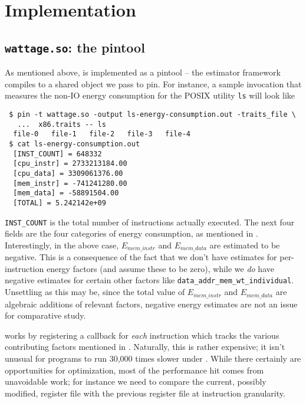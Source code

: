 \section{Implementation}

\subsection{\texttt{wattage.so}: the pintool}

As mentioned above, \wattage is implemented as a pintool -- the
estimator framework compiles to a shared object we pass to pin.  For
instance, a sample invocation that measures the non-IO energy
consumption for the POSIX utility \texttt{ls} will look like

\begin{verbatim}
 $ pin -t wattage.so -output ls-energy-consumption.out -traits_file \
   ...  x86.traits -- ls
  file-0   file-1   file-2   file-3   file-4
 $ cat ls-energy-consumption.out
  [INST_COUNT] = 648332
  [cpu_instr] = 2733213184.00
  [cpu_data] = 3309061376.00
  [mem_instr] = -741241280.00
  [mem_data] = -58891504.00
  [TOTAL] = 5.242142e+09
\end{verbatim}

\texttt{INST\_COUNT} is the total number of instructions actually
executed.  The next four fields are the four categories of energy
consumption, as mentioned in \refsec{lst:fields-desc}.  Interestingly,
in the above case, $E_{mem\_instr}$ and $E_{mem\_data}$ are estimated
to be negative.  This is a consequence of the fact that we don't have
estimates for per-instruction energy factors (and assume these to be
zero), while we \textit{do} have negative estimates for certain other
factors like \texttt{data\_addr\_mem\_wt\_individual}.  Unsettling as
this may be, since the total value of $E_{mem\_instr}$ and
$E_{mem\_data}$ are algebraic additions of relevant factors, negative
energy estimates are not an issue for comparative study.

\wattage works by registering a callback for \textit{each} instruction
which tracks the various contributing factors mentioned in
\cite{steinke}.  Naturally, this is rather expensive; it isn't unusual
for programs to run 30,000 times slower under \wattage.  While there
certainly are opportunities for optimization, most of the performance
hit comes from unavoidable work; for instance we need to compare the
current, possibly modified, register file with the previous register
file at instruction granularity.

